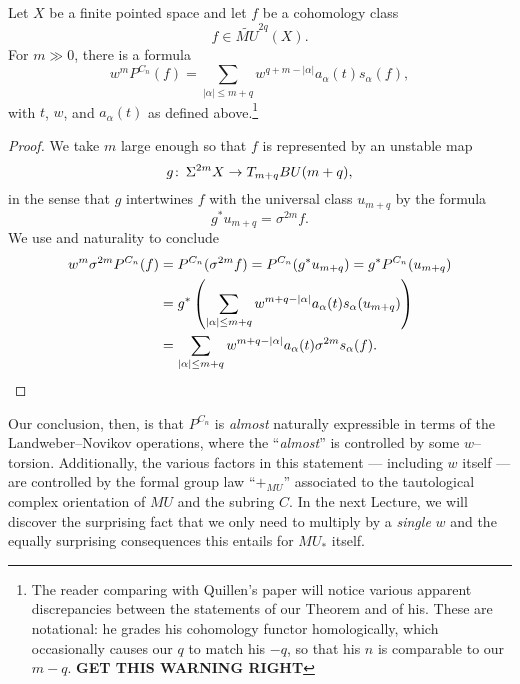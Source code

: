 \begin{theorem}\label{QuillensKeyRelation}
Let $X$ be a finite pointed space and let $f$ be a cohomology class \[f \in \widetilde{MU}^{2q}(X).\]  For $m \gg 0$, there is a formula \[w^m P^{C_n}(f) = \sum_{|\alpha| \le m+q} w^{q+m - |\alpha|} a_\alpha(t) s_\alpha(f),\] with $t$, $w$, and $a_\alpha(t)$ as defined above.\footnote{The reader comparing with Quillen's paper will notice various apparent discrepancies between the statements of our Theorem and of his.  These are notational: he grades his cohomology functor homologically, which occasionally causes our $q$ to match his $-q$, so that his $n$ is comparable to our $m-q$.  \textbf{GET THIS WARNING RIGHT}}
\end{theorem}
\begin{proof}
We take $m$ large enough so that $f$ is represented by an unstable map \[g\colon\thinspace \Sigma^{2m} X \to T_{m+q} BU(m+q),\] in the sense that $g$ intertwines $f$ with the universal class $u_{m+q}$ by the formula \[g^* u_{m+q} = \sigma^{2m} f.\]  We use  and naturality to conclude
\begin{align*}
w^m \sigma^{2m} P^{C_n}(f) & = P^{C_n}(\sigma^{2m} f) = P^{C_n}(g^* u_{m+q}) = g^* P^{C_n}(u_{m+q}) \\
& = g^* \left(\sum_{|\alpha| \le m+q} w^{m+q - |\alpha|} a_\alpha(t) s_\alpha(u_{m+q}) \right) \\
& = \sum_{|\alpha| \le m+q} w^{m+q - |\alpha|} a_\alpha(t) \sigma^{2m} s_\alpha(f). \qedhere
\end{align*}
\end{proof}

Our conclusion, then, is that $P^{C_n}$ is \emph{almost} naturally expressible in terms of the Landweber--Novikov operations, where the ``\emph{almost}'' is controlled by some $w$--torsion.  Additionally, the various factors in this statement --- including $w$ itself --- are controlled by the formal group law ``$+_{MU}$'' associated to the tautological complex orientation of $MU$ and the subring $C$.  In the next Lecture, we will discover the surprising fact that we only need to multiply by a \emph{single} $w$ and the equally surprising consequences this entails for $MU_*$ itself.











